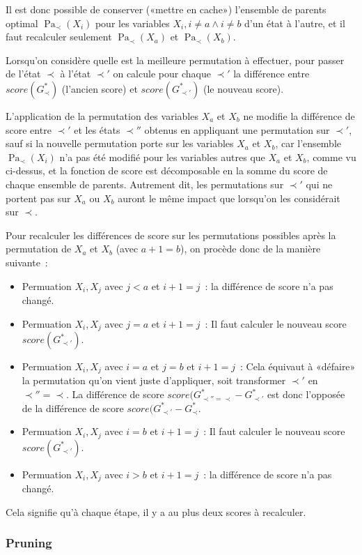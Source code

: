 \documentclass[french,a4paper]{article}
\DeclareMathOperator{\Pa}{Pa}
\begin{document}
Il est donc possible de conserver («mettre en cache») l'ensemble de
parents optimal $\Pa_\prec(X_i)$ pour les variables $X_i, i \neq a
\wedge i \neq b$ d'un état à l'autre, et il faut recalculer seulement
$\Pa_\prec(X_a)$ et $\Pa_\prec(X_b)$.

Lorsqu'on considère quelle est la meilleure permutation à effectuer,
pour passer de l'état $\prec$ à l'état $\prec'$ on calcule pour chaque
$\prec'$ la différence entre $score(G^*_\prec)$ (l'ancien score) et
$score(G^*_{\prec'})$ (le nouveau score).

L'application de la permutation des variables $X_a$ et $X_b$ ne
modifie la différence de score entre $\prec'$ et les états $\prec''$
obtenus en appliquant une permutation sur $\prec'$, sauf si la
nouvelle permutation porte sur les variables $X_a$ et $X_b$, car
l'ensemble $\Pa_\prec(X_i)$ n'a pas été modifié pour les variables
autres que $X_a$ et $X_b$, comme vu ci-dessus, et la fonction de score
est décomposable en la somme du score de chaque ensemble de
parents. Autrement dit, les permutations sur $\prec'$ qui ne portent
pas sur $X_a$ ou $X_b$ auront le même impact que lorsqu'on les
considérait sur $\prec$.

Pour recalculer les différences de score sur les permutations
possibles après la permutation de $X_a$ et $X_b$ (avec $a + 1 = b$),
on procède donc de la manière suivante~:
\begin{itemize}
\item Permuation $X_i,X_j$ avec $j < a$ et $i+1=j$~: la différence de
  score n'a pas changé.
\item Permuation $X_i,X_j$ avec $j = a$ et $i+1=j$~: Il faut calculer
  le nouveau score $score(G^*_{\prec'})$.
\item Permuation $X_i,X_j$ avec $i = a$ et $j = b$ et $i+1=j$~: Cela
  équivaut à «défaire» la permutation qu'on vient juste d'appliquer,
  soit transformer $\prec'$ en $\prec''=\prec$. La différence de score
  $score(G^*_{\prec'' = \prec}-G^*_{\prec'}$ est donc l'opposée de la
  différence de score $score(G^*_{\prec'}-G^*_{\prec}$.
\item Permuation $X_i,X_j$ avec $i = b$ et $i+1=j$~: Il faut calculer
  le nouveau score $score(G^*_{\prec'})$.
\item Permuation $X_i,X_j$ avec $i > b$ et $i+1=j$~: la différence de
  score n'a pas changé.
\end{itemize}
Cela signifie qu'à chaque étape, il y a au plus deux scores à
recalculer.

\subsubsection{Pruning}
\end{document}
